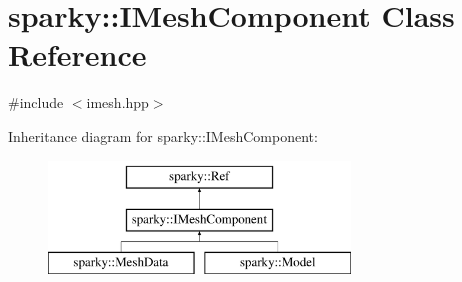 \hypertarget{classsparky_1_1_i_mesh_component}{}\section{sparky\+:\+:I\+Mesh\+Component Class Reference}
\label{classsparky_1_1_i_mesh_component}


{\ttfamily \#include $<$imesh.\+hpp$>$}

Inheritance diagram for sparky\+:\+:I\+Mesh\+Component\+:\begin{figure}[H]
\begin{center}
\leavevmode
\includegraphics[height=3.000000cm]{classsparky_1_1_i_mesh_component}
\end{center}
\end{figure}
